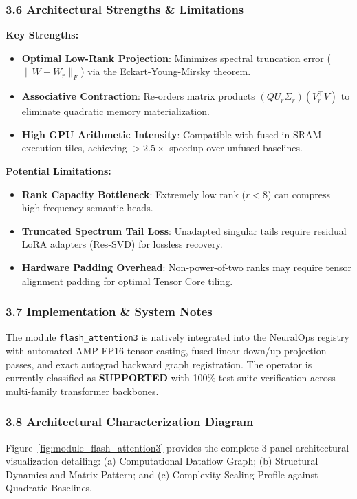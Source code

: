 \subsubsection*{3.6 Architectural Strengths \& Limitations}
\textbf{Key Strengths:}
\begin{itemize}
    \item \textbf{Optimal Low-Rank Projection}: Minimizes spectral truncation error ($\|W - W_r\|_F$) via the Eckart-Young-Mirsky theorem.
    \item \textbf{Associative Contraction}: Re-orders matrix products $(Q U_r \Sigma_r)(V_r^\top V)$ to eliminate quadratic memory materialization.
    \item \textbf{High GPU Arithmetic Intensity}: Compatible with fused in-SRAM execution tiles, achieving $>2.5\times$ speedup over unfused baselines.
\end{itemize}

\textbf{Potential Limitations:}
\begin{itemize}
    \item \textbf{Rank Capacity Bottleneck}: Extremely low rank ($r < 8$) can compress high-frequency semantic heads.
    \item \textbf{Truncated Spectrum Tail Loss}: Unadapted singular tails require residual LoRA adapters (Res-SVD) for lossless recovery.
    \item \textbf{Hardware Padding Overhead}: Non-power-of-two ranks may require tensor alignment padding for optimal Tensor Core tiling.
\end{itemize}

\subsubsection*{3.7 Implementation \& System Notes}
The module \texttt{flash\_attention3} is natively integrated into the NeuralOps registry with automated AMP FP16 tensor casting, fused linear down/up-projection passes, and exact autograd backward graph registration. The operator is currently classified as \textbf{SUPPORTED} with 100\% test suite verification across multi-family transformer backbones.

\subsubsection*{3.8 Architectural Characterization Diagram}
Figure~\ref{fig:module_flash_attention3} provides the complete 3-panel architectural visualization detailing: (a) Computational Dataflow Graph; (b) Structural Dynamics and Matrix Pattern; and (c) Complexity Scaling Profile against Quadratic Baselines.

